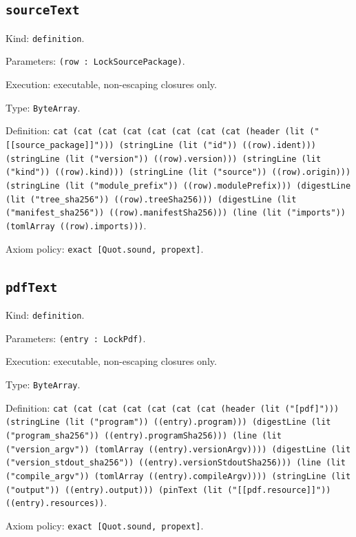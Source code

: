 \documentclass[11pt]{article}
\begin{document}
\subsection*{\texttt{sourceText}}
\noindent Kind: \texttt{definition}.\par
\noindent Parameters: \texttt{(row : LockSourcePackage)}.\par
\noindent Execution: executable, non-escaping closures only.\par
\noindent Type: \texttt{ByteArray}.\par
\noindent Definition: \texttt{cat (cat (cat (cat (cat (cat (cat (cat (header (lit ("[[source\_package]]"))) (stringLine (lit ("id")) ((row).ident))) (stringLine (lit ("version")) ((row).version))) (stringLine (lit ("kind")) ((row).kind))) (stringLine (lit ("source")) ((row).origin))) (stringLine (lit ("module\_prefix")) ((row).modulePrefix))) (digestLine (lit ("tree\_sha256")) ((row).treeSha256))) (digestLine (lit ("manifest\_sha256")) ((row).manifestSha256))) (line (lit ("imports")) (tomlArray ((row).imports)))}.\par
\noindent Axiom policy: \texttt{exact [Quot.sound, propext]}.\par
\subsection*{\texttt{pdfText}}
\noindent Kind: \texttt{definition}.\par
\noindent Parameters: \texttt{(entry : LockPdf)}.\par
\noindent Execution: executable, non-escaping closures only.\par
\noindent Type: \texttt{ByteArray}.\par
\noindent Definition: \texttt{cat (cat (cat (cat (cat (cat (cat (header (lit ("[pdf]"))) (stringLine (lit ("program")) ((entry).program))) (digestLine (lit ("program\_sha256")) ((entry).programSha256))) (line (lit ("version\_argv")) (tomlArray ((entry).versionArgv)))) (digestLine (lit ("version\_stdout\_sha256")) ((entry).versionStdoutSha256))) (line (lit ("compile\_argv")) (tomlArray ((entry).compileArgv)))) (stringLine (lit ("output")) ((entry).output))) (pinText (lit ("[[pdf.resource]]")) ((entry).resources))}.\par
\noindent Axiom policy: \texttt{exact [Quot.sound, propext]}.\par
\end{document}
